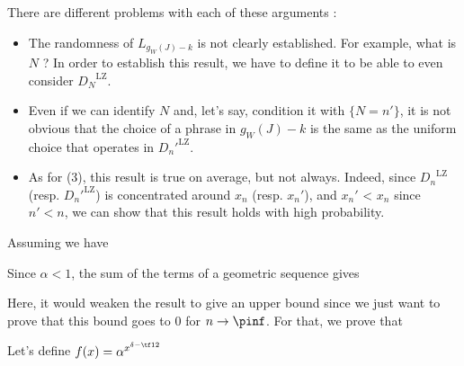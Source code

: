 There are different problems with each of these arguments :

\begin{itemize}
    \item The randomness of $L_{g_W(J)-k}$ is not clearly
          established. For example, what is $N$ ? In order
          to establish this result, we have to define it
          to be able to even consider ${D_N}^{\text{LZ}}$.

    \item Even if we can identify $N$ and, let's say,
          condition it with $\{ N = n' \}$, it is not obvious
          that the choice of a phrase in ${g_W(J)-k}$
          is the same as the uniform choice that operates
          in ${D_n'}^{\text{LZ}}$.

    \item As for (3), this result is true on average, but 
          not always. Indeed, since ${D_n}^{\text{LZ}}$
          (resp. ${D_n'}^{\text{LZ}}$) is concentrated
          around $x_n$ (resp. $x_n'$), and $x_n'$ < $x_n$
          since $n' < n$, we can show 
          that this result holds with high probability.
\end{itemize}








Assuming we have


\noindent Since $\alpha < 1$, the sum of the terms of a geometric sequence gives


\noindent Here, it would weaken the result to give an upper bound since
we just want to prove that this bound goes to 0 for $n\rightarrow\pinf$.
For that, we prove that

\leftcenters
    {Let's define}
    {$ f(x) = \alpha^{ x^ { \delta - \tf12 } } $}

